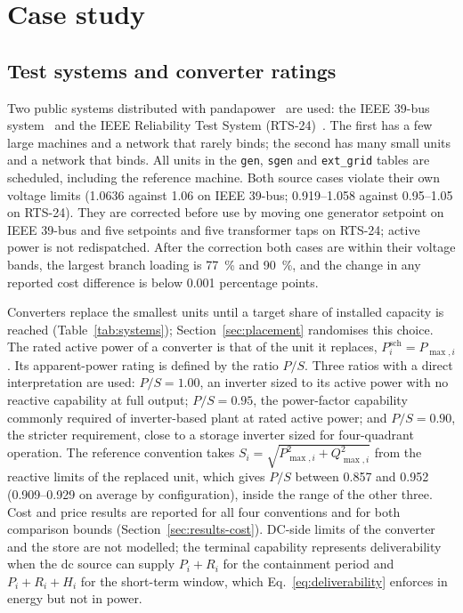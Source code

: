 
\section{Case study}
\label{sec:case}

\subsection{Test systems and converter ratings}
\label{sec:systems}

Two public systems distributed with pandapower~\cite{thurner2018pandapower}
are used: the IEEE 39-bus system~\cite{pai1989energy} and the IEEE
Reliability Test System (RTS-24)~\cite{grigg1999rts}. The first has a few
large machines and a network that rarely binds; the second has many small
units and a network that binds. All units in the \texttt{gen},
\texttt{sgen} and \texttt{ext\_grid} tables are scheduled, including the
reference machine. Both source cases violate their own voltage limits
(\SI{1.0636}{\pu} against \SI{1.06}{\pu} on IEEE 39-bus;
\SIrange{0.919}{1.058}{\pu} against \SIrange{0.95}{1.05}{\pu} on RTS-24).
They are corrected before use by moving one generator setpoint on IEEE 39-bus
and five setpoints and five transformer taps on RTS-24; active power is
not redispatched. After the
correction both cases are within their voltage bands, the largest branch
loading is \SI{77}{\percent} and \SI{90}{\percent}, and the change in any
reported cost difference is below \num{0.001} percentage points.

Converters replace the smallest units until a target share of installed
capacity is reached (Table~\ref{tab:systems}); Section~\ref{sec:placement}
randomises this choice. The rated active power of a converter is that of the
unit it replaces, $P^{\mathrm{sch}}_i = P_{\max,i}$. Its apparent-power
rating is defined by the ratio $P/S$. Three ratios with a direct
interpretation are used: $P/S = 1.00$, an inverter sized to its active power
with no reactive capability at full output; $P/S = 0.95$, the power-factor
capability commonly required of inverter-based plant at rated active power;
and $P/S = 0.90$, the stricter requirement, close to a storage inverter sized
for four-quadrant operation. The reference convention takes
$S_i = \sqrt{P_{\max,i}^2 + Q_{\max,i}^2}$ from the reactive limits of the
replaced unit, which gives $P/S$ between \num{0.857} and \num{0.952}
(\numrange{0.909}{0.929} on average by configuration), inside the range of
the other three. Cost and price results
are reported for all four conventions and for both comparison bounds
(Section~\ref{sec:results-cost}). DC-side limits of the converter and the
store are not modelled; the terminal capability represents deliverability
when the dc source can supply $P_i + R_i$ for the containment period and
$P_i + R_i + H_i$ for the short-term window, which
Eq.~\eqref{eq:deliverability} enforces in energy but not in power.


